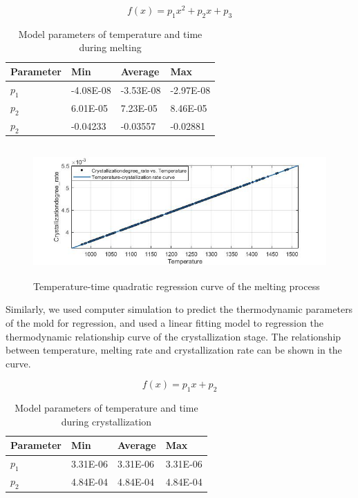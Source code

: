 \documentclass{apmcmthesis}
\begin{document}
	\begin{equation}
		\tag{7-3-1}
		f(x) =  p_{1}x^{2}+p_{2}x+p_{3}
	\end{equation}
	\begin{table}[htbp!]
			\caption{Model parameters of temperature and time during melting}
		\centering
		\begin{tabular}{@{}llll@{}}
			\toprule
			\textbf{Parameter} & \textbf{Min} & \textbf{Average} & \textbf{Max} \\ \midrule
			$p_{1}$            & -4.08E-08    & -3.53E-08        & -2.97E-08    \\
			$p_{2}$            & 6.01E-05     & 7.23E-05         & 8.46E-05     \\
			$p_{2}$            & -0.04233     & -0.03557         & -0.02881     \\ \bottomrule
		\end{tabular}
	\end{table}
\begin{figure}[htbp!]
	\centering
	\includegraphics[height=5cm]{./figures/7-3.jpg}
	\caption{Temperature-time quadratic regression curve of the melting process}
\end{figure}
	
Similarly, we used computer simulation to predict the thermodynamic parameters of the mold for regression, and used a linear fitting model to regression the thermodynamic relationship curve of the crystallization stage. The relationship between temperature, melting rate and crystallization rate can be shown in the curve.

\begin{equation}
	\tag{7-3-2}
	f(x) =  p_{1}x+p_{2}
\end{equation}

\begin{table}[htbp!]
	\caption{Model parameters of temperature and time during crystallization}
	\centering
	\begin{tabular}{@{}llll@{}}
		\toprule
		\textbf{Parameter} & \textbf{Min} & \textbf{Average} & \textbf{Max} \\ \midrule
		$p_{1}$            & 3.31E-06     & 3.31E-06         & 3.31E-06     \\
		$p_{2}$            & 4.84E-04     & 4.84E-04         & 4.84E-04     \\ \bottomrule
	\end{tabular}
\end{table}
\end{document}
